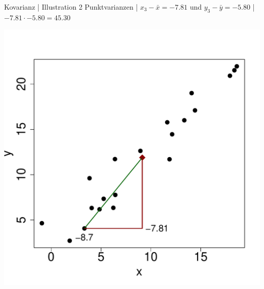 \begin{frame}
  {Kovarianz | Illustration 2}
  Punktvarianzen | $x_3-\bar{x}=-7.81$ und $y_3-\bar{y}=-5.80$ | \alert{$-7.81\cdot-5.80=45.30$}\\
  \begin{center}
    \includegraphics[height=0.7\textheight]{graphics/cov03}
  \end{center}
\end{frame}



